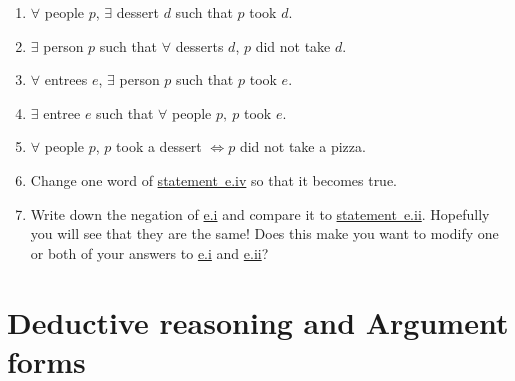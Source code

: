 \documentclass[10pt,]{book}
\theoremstyle{plain}
\theoremstyle{definition}
\theoremstyle{definition}
\numberwithin{equation}{section}
\newcommand{\hint}[1]{ }
\begin{document}
\begin{enumerate}[label=(\alph*)]
\begin{enumerate}[label=\roman*.]
\item\hypertarget{negated}{}
          \(\forall\) people \(p\), \(\exists\) dessert \(d\) such that \(p\)
          took \(d\). \hint{false}
\item\hypertarget{compare}{}
          \(\exists\) person \(p\) such that \(\forall\) desserts
          \(d\), \(p\) did not take \(d\). \hint{true}
\item\hypertarget{li-194}{}
          \(\forall\) entrees \(e\), \(\exists\) person \(p\) such that \(p\) took
          \(e\). \hint{true}
\item\hypertarget{entree}{}
          \(\exists\) entree \(e\) such that  \(\forall\) people
          \(p,\ p\) took \(e\). \hint{false}
\item\hypertarget{li-196}{}
          \(\forall\) people \(p\), \(p\) took a dessert \(\iff p\) did not take
          a pizza. \hint{true}
\item\hypertarget{li-197}{}
          Change one word of \hyperlink{entree}{statement~e.iv} so that it becomes true. \hint{entree \(\longrightarrow\) beverage}
\item\hypertarget{li-198}{}
          Write down the negation of \hyperlink{negated}{e.i} and compare it to \hyperlink{compare}{statement~e.ii}. Hopefully you will see that they are the same! Does
          this make you want to modify one or both of your answers to \hyperlink{negated}{e.i}
          and \hyperlink{compare}{e.ii}? \hint{\(\exists\) person \(p\) such that \(\forall\) desserts
          \(d\), \(p\) did not take \(d\). Yes I do.  No, I got them right in the first place!}
\end{enumerate}

\end{enumerate}
\typeout{************************************************}
\typeout{************************************************}
\section[{Deductive reasoning and Argument forms}]{Deductive reasoning and Argument forms}\label{sec_deduct}
\end{document}
